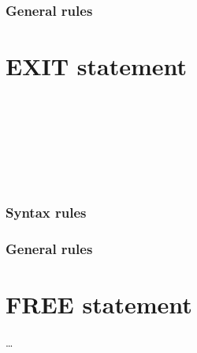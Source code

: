 \subsubsection{General rules}

\section{EXIT statement}

\begin{syntax}
  \begin{0-1}
     \\
     \\

    \begin{0-1}
    \end{0-1} \\

     \\

     \\
  \end{0-1}
\end{syntax}

\subsubsection{Syntax rules}

\subsubsection{General rules}

\section{FREE statement}

\begin{syntax}
  \begin{1=}
    \identifier
  \end{1=} \ldots
\end{syntax}

